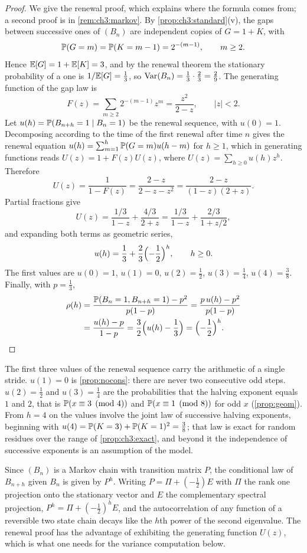 \begin{proof}
We give the renewal proof, which explains where the formula comes from; a
second proof is in \cref{rem:ch3:markov}. By
\cref{prop:ch3:standard}(v), the gaps between successive ones of $(B_n)$ are
independent copies of $G=1+K$, with
\[
  \mathbb{P}(G=m)=\mathbb{P}(K=m-1)=2^{-(m-1)},\qquad m\geq2 .
\]
Hence $\mathbb{E}[G]=1+\mathbb{E}[K]=3$, and by the renewal theorem the stationary probability
of a one is $1/\mathbb{E}[G]=\frac13$, so $\operatorname{Var}(B_n)=\frac13\cdot\frac23=\frac29$. The
generating function of the gap law is
\[
  F(z)=\sum_{m\geq2}2^{-(m-1)}z^m=\frac{z^2}{2-z},\qquad|z|<2 .
\]
Let $u(h)=\mathbb{P}(B_{n+h}=1\mid B_n=1)$ be the renewal sequence, with $u(0)=1$.
Decomposing according to the time of the first renewal after time $n$ gives the
renewal equation $u(h)=\sum_{m=1}^{h}\mathbb{P}(G=m)u(h-m)$ for $h\geq1$, which in
generating functions reads $U(z)=1+F(z)U(z)$, where
$U(z)=\sum_{h\geq0}u(h)z^h$. Therefore
\[
  U(z)=\frac{1}{1-F(z)}=\frac{2-z}{2-z-z^2}=\frac{2-z}{(1-z)(2+z)} .
\]
Partial fractions give
\[
  U(z)=\frac{1/3}{1-z}+\frac{4/3}{2+z}
      =\frac{1/3}{1-z}+\frac{2/3}{1+z/2},
\]
and expanding both terms as geometric series,
\begin{equation}\label{eq:ch3:renewal}
  u(h)=\frac13+\frac23\Bigl(-\frac12\Bigr)^{h},\qquad h\geq0 .
\end{equation}
The first values are $u(0)=1$, $u(1)=0$, $u(2)=\frac12$, $u(3)=\frac14$,
$u(4)=\frac38$. Finally, with $p=\frac13$,
\begin{align*}
  \rho(h)&=\frac{\mathbb{P}(B_n=1,B_{n+h}=1)-p^2}{p(1-p)}=\frac{p\,u(h)-p^2}{p(1-p)}\\
  &=\frac{u(h)-p}{1-p}=\frac32\Bigl(u(h)-\frac13\Bigr)=\Bigl(-\frac12\Bigr)^{h}. \qedhere
\end{align*}
\end{proof}

The first three values of the renewal sequence carry the arithmetic of a single stride.
$u(1)=0$ is \cref{prop:nocons}: there are never two consecutive odd steps.
$u(2)=\tfrac12$ and $u(3)=\tfrac14$ are the probabilities that the halving exponent equals $1$ and $2$, that is $\mathbb{P}(x\equiv3\pmod4)$ and $\mathbb{P}(x\equiv1\pmod8)$ for odd $x$ (\cref{prop:geom}).
From $h=4$ on the values involve the joint law of successive halving exponents, beginning with $u(4)=\mathbb{P}(K=3)+\mathbb{P}(K=1)^2=\tfrac38$; that law is exact for random residues over the range of \cref{prop:ch3:exact}, and beyond it the independence of successive exponents is an assumption of the model.

\begin{remark}\label{rem:ch3:markov}
Since $(B_n)$ is a Markov chain with transition matrix $P$, the conditional
law of $B_{n+h}$ given $B_n$ is given by $P^h$. Writing $P=\Pi+(-\tfrac12)E$ with
$\Pi$ the rank one projection onto the stationary vector and $E$ the
complementary spectral projection, $P^h=\Pi+(-\tfrac12)^hE$, and the
autocorrelation of any function of a reversible two state chain decays like
the $h$th power of the second eigenvalue. The renewal proof has the advantage
of exhibiting the generating function $U(z)$, which is what one needs for
the variance computation below.
\end{remark}

